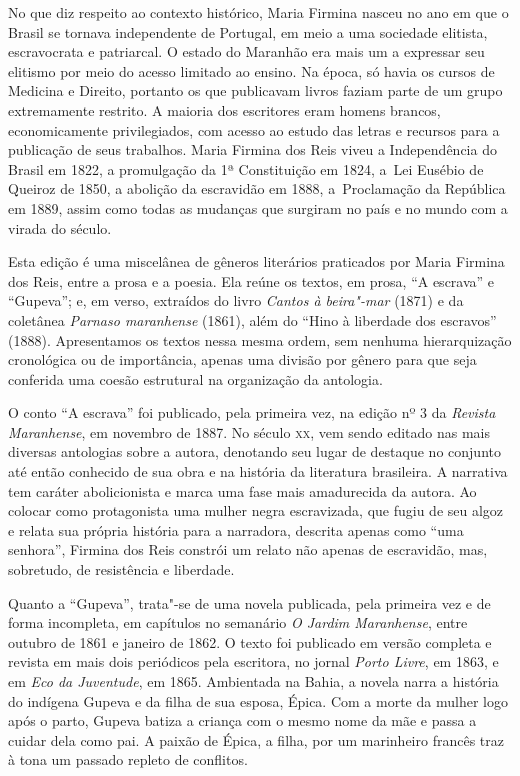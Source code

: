 \documentclass[12pt]{extarticle}
\begin{document}
No que diz respeito ao contexto histórico, Maria Firmina nasceu no ano
em que o Brasil se tornava independente de Portugal, em meio a uma
sociedade elitista, escravocrata e patriarcal. O estado do Maranhão era
mais um a expressar seu elitismo por meio do acesso limitado ao ensino.
Na época, só havia os cursos de Medicina e Direito, portanto os que
publicavam livros faziam parte de um grupo extremamente restrito. A
maioria dos escritores eram homens brancos, economicamente
privilegiados, com acesso ao estudo das letras e recursos para a
publicação de seus trabalhos. Maria Firmina dos Reis viveu a
Independência do Brasil em 1822, a promulgação da 1ª Constituição em
1824, a~Lei Eusébio de Queiroz de 1850, a abolição da escravidão em
1888, a~Proclamação da República em 1889, assim como todas as mudanças
que surgiram no país e no mundo com a virada do século.

Esta edição é uma miscelânea de gêneros literários praticados por Maria
Firmina dos Reis, entre a prosa e a poesia. Ela reúne os textos, em
prosa, ``A escrava'' e ``Gupeva''; e, em verso, extraídos do livro
\emph{Cantos à beira"-mar} (1871) e da coletânea \emph{Parnaso
maranhense} (1861), além do ``Hino à liberdade dos escravos'' (1888).
Apresentamos os textos nessa mesma ordem, sem nenhuma hierarquização
cronológica ou de importância, apenas uma divisão por gênero para que
seja conferida uma coesão estrutural na organização da antologia.

O conto ``A escrava'' foi publicado, pela primeira vez, na edição nº 3
da \emph{Revista Maranhense}, em novembro de 1887. No século \textsc{xx}, vem
sendo editado nas mais diversas antologias sobre a autora, denotando seu
lugar de destaque no conjunto até então conhecido de sua obra e na
história da literatura brasileira. A narrativa tem caráter abolicionista
e marca uma fase mais amadurecida da autora. Ao colocar como
protagonista uma mulher negra escravizada, que fugiu de seu algoz e
relata sua própria história para a narradora, descrita apenas como ``uma
senhora'', Firmina dos Reis constrói um relato não apenas de escravidão,
mas, sobretudo, de resistência e liberdade.

Quanto a ``Gupeva'', trata"-se de uma novela publicada, pela primeira vez
e de forma incompleta, em capítulos no semanário \emph{O Jardim
Maranhense}, entre outubro de 1861 e janeiro de 1862. O texto foi
publicado em versão completa e revista em mais dois periódicos pela
escritora, no jornal \emph{Porto Livre}, em 1863, e em \emph{Eco da
Juventude}, em 1865. Ambientada na Bahia, a novela narra a história do
indígena Gupeva e da filha de sua esposa, Épica. Com a morte da mulher
logo após o parto, Gupeva batiza a criança com o mesmo nome da mãe e
passa a cuidar dela como pai. A paixão de Épica, a filha, por um
marinheiro francês traz à tona um passado repleto de conflitos.
\end{document}
